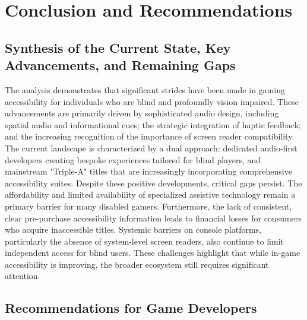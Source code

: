 \section{Conclusion and Recommendations}


\subsection{Synthesis of the Current State, Key Advancements, and Remaining Gaps}

The analysis demonstrates that significant strides have been made in gaming accessibility for individuals who are blind and profoundly vision impaired. These advancements are primarily driven by sophisticated audio design, including spatial audio and informational cues; the strategic integration of haptic feedback; and the increasing recognition of the importance of screen reader compatibility. The current landscape is characterized by a dual approach: dedicated audio-first developers creating bespoke experiences tailored for blind players, and mainstream "Triple-A" titles that are increasingly incorporating comprehensive accessibility suites.
Despite these positive developments, critical gaps persist. The affordability and limited availability of specialized assistive technology remain a primary barrier for many disabled gamers. Furthermore, the lack of consistent, clear pre-purchase accessibility information leads to financial losses for consumers who acquire inaccessible titles. Systemic barriers on console platforms, particularly the absence of system-level screen readers, also continue to limit independent access for blind users. These challenges highlight that while in-game accessibility is improving, the broader ecosystem still requires significant attention.

\subsection{Recommendations for Game Developers}

